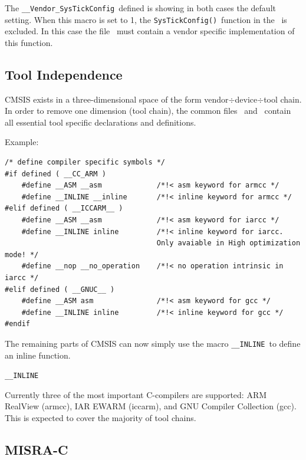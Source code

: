 The \verb"__Vendor_SysTickConfig"\ defined is showing in both cases the default
setting. When this macro is set to 1, the \verb|SysTickConfig()|\ function in
the \ is excluded. In this case the file 
\ must contain a vendor specific implementation of this
function.

\subsection{Tool Independence}

CMSIS exists in a three-dimensional space of the form
vendor$\div$device$\div$tool chain.
In order to remove one dimension (tool chain), the common files
\ and \ contain all essential tool specific
declarations and definitions.

\bigskip
Example:

\begin{lstlisting}[style=cpp]
/* define compiler specific symbols */
#if defined ( __CC_ARM )
	#define __ASM __asm				/*!< asm keyword for armcc */
	#define __INLINE __inline		/*!< inline keyword for armcc */
#elif defined ( __ICCARM__ )
	#define __ASM __asm				/*!< asm keyword for iarcc */
	#define __INLINE inline			/*!< inline keyword for iarcc.
									Only avaiable in High optimization mode! */
	#define __nop __no_operation	/*!< no operation intrinsic in iarcc */
#elif defined ( __GNUC__ )
	#define __ASM asm 				/*!< asm keyword for gcc */
	#define __INLINE inline 		/*!< inline keyword for gcc */
#endif
\end{lstlisting}

The remaining parts of CMSIS can now simply use the macro \verb|__INLINE|\ to
define an inline function.

\verb|__INLINE|\ 

\bigskip
Currently three of the most important C-compilers are supported: ARM RealView
(armcc), IAR EWARM (iccarm), and GNU Compiler Collection (gcc). This is expected
to cover the majority of tool chains.


\subsection{MISRA-C}

